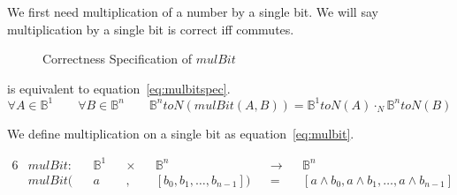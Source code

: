 \documentclass[14pt]{extarticle}  %
\begin{document}
We first need multiplication
of a number by a single bit. We will say multiplication by a single bit is correct iff  commutes.
\begin{figure}
\centering
\caption{Correctness Specification of $mulBit$}
\label{fig:mulbitspec}
\end{figure}

 is equivalent to equation~\ref{eq:mulbitspec}.
\begin{equation}\label{eq:mulbitspec}
  \forall A \in \mathbb{B}^{1} \qquad \forall B \in \mathbb{B}^{n} \qquad \mathbb{B}^{n}toN(mulBit(A,B)) = \mathbb{B}^{1}toN(A) \cdot_{N} \mathbb{B}^{n}toN(B)
\end{equation}


We define multiplication on a single bit as equation~\ref{eq:mulbit}.

\begin{alignat}{6}\label{eq:mulbit}
  &mulBit : &&\mathbb{B}^{1} &&\times &&\mathbb{B}^{n} &&\to &&\mathbb{B}^{n}\\
  &mulBit(&&a &&, &&[b_{0}, b_{1},\ldots,b_{n-1}]) &&= &&[a \land b_{0}, a\land b_{1}, \ldots, a \land b_{n-1}]
\end{alignat}
\end{document}

